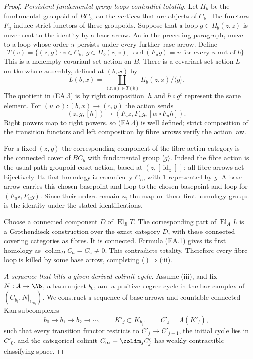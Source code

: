 \begin{proof}
\emph{Persistent fundamental-group loops contradict totality.}
Let $\Pi_b$ be the fundamental groupoid of $BC_b$, on the
vertices that are objects of $C_b$. The functors $F_u$ induce
strict functors of these groupoids. Suppose that a loop
$g\in\Pi_b(z,z)$ is never sent to the identity by a base arrow.
As in the preceding paragraph, move to a loop whose order
$n$ persists under every further base arrow. Define
\[
 T(b)=\{(z,g): z\in C_b,\ g\in\Pi_b(z,z),
       \ \operatorname{ord}(F_u g)=n
          \text{ for every }u\text{ out of }b\}.
 \tag{EA.2}
\]
This is a nonempty covariant set action on $B$.
There is a covariant set action $L$ on the whole assembly,
defined at $(b,x)$ by
\[
 L(b,x)=\coprod_{(z,g)\in T(b)}
      \Pi_b(z,x)/\langle g\rangle.
 \tag{EA.3}
\]
The quotient in (EA.3) is by right composition: $h$ and
$h\circ g^k$ represent the same element. For
$(u,\alpha):(b,x)\to(c,y)$ the action sends
\[
 (z,g,[h])\longmapsto
       (F_u z,F_u g,[\alpha\circ F_u h]).
 \tag{EA.4}
\]
Right powers map to right powers, so (EA.4) is well defined;
strict composition of the transition functors and left
composition by fibre arrows verify the action law.

For a fixed $(z,g)$ the corresponding component of the fibre
action category is the connected cover of $BC_b$ with
fundamental group $\langle g\rangle$. Indeed the fibre
action is the usual path-groupoid coset action, based at
$(z,[\operatorname{id}_z])$; all fibre arrows act bijectively.
Its first homology is canonically $C_n$, with $1$ represented
by $g$. A base arrow carries this chosen basepoint and loop
to the chosen basepoint and loop for $(F_u z,F_u g)$.
Since their orders remain $n$, the map on these first
homology groups is the identity under the stated identifications.

Choose a connected component $D$ of $\operatorname{El}_B T$.
The corresponding part of $\operatorname{El}_A L$ is a
Grothendieck construction over the exact category $D$, with
these connected covering categories as fibres. It is connected.
Formula (EA.1) gives its first homology as
$\operatorname{colim}_D C_n=C_n\ne0$. This contradicts
totality. Therefore every fibre loop is killed by some base
arrow, completing (i)$\Rightarrow$(iii).

\emph{A sequence that kills a given derived-colimit cycle.}
Assume (iii), and fix $N:A\to\Ab$, a base object $b_0$, and
a positive-degree cycle in the bar complex of
$(C_{b_0},N|_{C_{b_0}})$. We construct a sequence of base
arrows and countable connected Kan subcomplexes
\[
 b_0\longrightarrow b_1\longrightarrow b_2\longrightarrow\cdots,
 \qquad K'_j\subset K_{b_j},
 \qquad C'_j=A(K'_j),
 \tag{EA.5}
\]
such that every transition functor restricts to
$C'_j\to C'_{j+1}$, the initial cycle lies in $C'_0$, and
the categorical colimit $C_\infty=\colim_j C'_j$ has weakly
contractible classifying space.


\end{proof}
